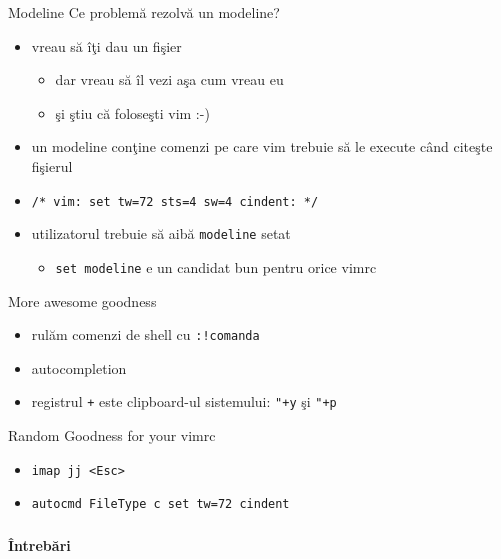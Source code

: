 \documentclass{beamer}
\begin{document}
\begin{frame}{Modeline}
Ce problemă rezolvă un modeline?
\begin{itemize}
  \item<1-> vreau să îţi dau un fişier
    \begin{itemize}
    \item<2-> dar vreau să îl vezi aşa cum vreau eu
    \item<3-> şi ştiu că foloseşti vim :-)
    \end{itemize}
  \item<4-> un modeline conţine comenzi pe care vim trebuie să le execute când
  citeşte fişierul
  \item<5-> \texttt{/* vim: set tw=72 sts=4 sw=4 cindent: */}
  \item<6-> utilizatorul trebuie să aibă \texttt{modeline} setat
    \begin{itemize}
    \item<7-> \texttt{set modeline} e un candidat bun pentru orice vimrc
    \end{itemize}
\end{itemize}
\end{frame}

\begin{frame}{More awesome goodness}
\begin{itemize}
  \item rulăm comenzi de shell cu \texttt{:!comanda}
  \pause
  \item autocompletion
  \pause
  \item registrul \texttt{+} este clipboard-ul sistemului: \texttt{"+y} şi
  \texttt{"+p}
\end{itemize}
\end{frame}

\begin{frame}{Random Goodness for your vimrc}
\begin{itemize}
  \item<1-> \texttt{imap jj <Esc>}
  \item<2-> \texttt{autocmd FileType c 	set tw=72 cindent}
\end{itemize}
\end{frame}

\begin{frame}
  \frametitle{}
  \begin{center}
    {\Huge \bfseries Întrebări}
  \end{center}
\end{frame}
\end{document}
